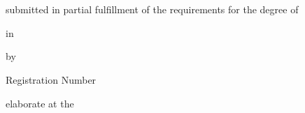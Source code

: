\begin{otherlanguage}{english}

\begin{center}
{\ \vspace{3.4cm}}

\begin{minipage}[t][2.8cm][t]{\textwidth}%
\begin{center}
{\thesistitlefontHUGE\sffamily\bfseries\tuinfthesistitle}\\
\bigskip
{\thesistitlefonthuge\sffamily\bfseries\tuinfthesissubtitle}
\end{center}
\end{minipage}

\vspace{1.3cm}

{\thesistitlefontLARGE\sffamily \tuinfthesistypeen}

\vspace{6mm}

{\thesistitlefontlarge\sffamily submitted in partial fulfillment of the requirements for the degree of}

\vspace{6mm}

{\thesistitlefontLARGE\sffamily\bfseries \tuinfthesisdegreeen}

\vspace{6mm}

{\thesistitlefontlarge\sffamily in}

\vspace{6mm}

{\thesistitlefontLarge\sffamily\bfseries \tuinfthesiscurriculumen}

\vspace{6.5mm}

{\thesistitlefontlarge\sffamily by}

\vspace{6mm}

{\thesistitlefontLarge\sffamily\bfseries \tuinfthesisauthor}

\vspace{1.5mm}

{\thesistitlefontlarge\sffamily Registration Number \tuinfthesismatrikelno} 

\vspace{1.4cm}

\begin{minipage}[t][3cm][t]{\textwidth}%
  \vspace{0pt}\raggedright\thesistitlefontnormalsize\sffamily
  elaborate at the


\end{minipage}
\end{center}
\end{otherlanguage}
